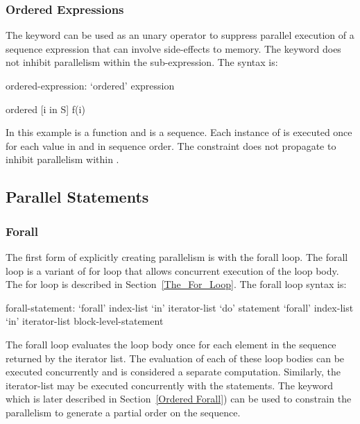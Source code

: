 \subsubsection{Ordered Expressions}
\label{Ordered_Expressions}

The  keyword can be used as an unary operator to
suppress parallel execution of a sequence expression that can involve
side-effects to memory. The  keyword does not inhibit
parallelism within the sub-expression. The syntax is:
\begin{syntax}
ordered-expression:
   `ordered' expression
\end{syntax}

\begin{example}
\begin{chapel}
ordered [i in S] f(i) 
\end{chapel}
In this example  is a function and  is a
sequence. Each instance of  is executed once for each value
in  and in sequence order. The  constraint does
not propagate to inhibit parallelism within .
\end{example}

\subsection{Parallel Statements}
\label{Parallel_Statements}



\subsubsection{Forall}
\label{Forall}

The first form of explicitly creating parallelism is with the forall
loop. The forall loop is a variant of for loop that allows concurrent
execution of the loop body. The for loop is described in
Section~\ref{The_For_Loop}. The forall loop syntax is:
\begin{syntax}
forall-statement:
   `forall' index-list `in' iterator-list `do' statement
   `forall' index-list `in' iterator-list block-level-statement
\end{syntax}

The forall loop evaluates the loop body once for each element in the
sequence returned by the iterator list. The evaluation of each of
these loop bodies can be executed concurrently and is considered a
separate computation. Similarly, the iterator-list may be executed
concurrently with the statements. The keyword  which is
later described in Section~\ref{Ordered Forall}) can be used to constrain
the parallelism to generate a partial order on the sequence.

